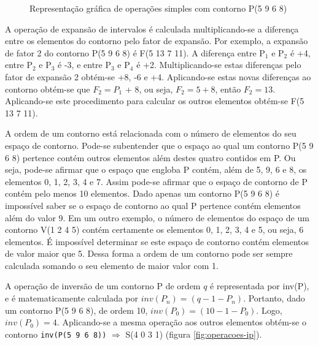 \begin{figure}
  \centering
  \subfloat[Contorno P]{
    \texttt{[image: c-5968]}
    \label{fig:operacoes-p}
  }
  \subfloat[Inversão de P]{
    \texttt{[image: c-4031]}
    \label{fig:operacoes-ip}
  }

  \subfloat[Retrógrado de P]{
    \texttt{[image: c-8695]}
    \label{fig:operacoes-rp}
  }

  \subfloat[Rotação 1 de P]{
    \texttt{[image: c-9685]}
    \label{fig:operacoes-rr1}
  }
  \subfloat[Rotação 2 de P]{
    \texttt{[image: c-6859]}
    \label{fig:operacoes-rr2}
  }
  \subfloat[Rotação 3 de P]{
    \texttt{[image: c-8596]}
    \label{fig:operacoes-rr3}
  }
  \caption{Representação gráfica de operações simples com contorno P(5
  9 6 8)}
  \label{fig:operacoes-simples}
\end{figure}

A operação de expansão de intervalos é calculada multiplicando-se a
diferença entre os elementos do contorno pelo fator de expansão. Por
exemplo, a expansão de fator 2 do contorno P(5 9 6 8) é F(5 13 7
11). A diferença entre P$_1$ e P$_2$ é +4, entre P$_2$ e P$_3$ é -3, e
entre P$_3$ e P$_4$ é +2. Multiplicando-se estas diferenças pelo fator
de expansão 2 obtém-se +8, -6 e +4. Aplicando-se estas novas
diferenças ao contorno obtém-se que $F_2 = P_1$ + 8, ou seja, $F_2 = 5
+ 8$, então $F_2 = 13$. Aplicando-se este procedimento para calcular
os outros elementos obtém-se F(5 13 7 11).

A ordem de um contorno está relacionada com o número de elementos do
seu espaço de contorno. Pode-se subentender que o espaço ao qual um
contorno P(5 9 6 8) pertence contém outros elementos além destes
quatro contidos em P. Ou seja, pode-se afirmar que o espaço que
engloba P contém, além de 5, 9, 6 e 8, os elementos 0, 1, 2, 3, 4 e
7. Assim pode-se afirmar que o espaço de contorno de P contém pelo
menos 10 elementos. Dado apenas um contorno P(5 9 6 8) é impossível
saber se o espaço de contorno ao qual P pertence contém elementos além
do valor 9. Em um outro exemplo, o número de elementos do espaço de um
contorno V(1 2 4 5) contém certamente os elementos 0, 1, 2, 3, 4 e 5,
ou seja, 6 elementos. É impossível determinar se este espaço de
contorno contém elementos de valor maior que 5. Dessa forma a ordem de
um contorno pode ser sempre calculada somando o seu elemento de maior
valor com 1.

A operação de inversão de um contorno P de ordem $q$ é representada
por inv(P), e é matematicamente calculada por
$inv(P_n)=(q-1-P_n)$. Portanto, dado um contorno P(5 9 6 8), de ordem
10, $inv(P_0)=(10-1-P_0)$. Logo, $inv(P_0)=4$. Aplicando-se a mesma
operação aos outros elementos obtém-se o contorno
\verb!inv(P(5 9 6 8))!  $\Rightarrow$ S(4 0 3 1) (figura
\ref{fig:operacoes-ip}).

